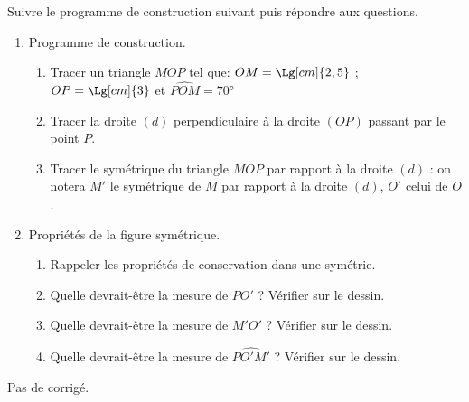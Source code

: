 \begin{exercice*}
   Suivre le programme de construction suivant puis répondre aux questions.
   \begin{enumerate}
      \item Programme de construction.
      \begin{enumerate}
         \item Tracer un triangle $MOP$ tel que: $OM = \Lg[cm]{2,5}$ ; $OP = \Lg[cm]{3}$ et $\widehat{POM} = \ang{70}$
         \item Tracer la droite $(d)$ perpendiculaire à la droite $(OP)$ passant par le point $P$.
         \item Tracer le symétrique du triangle $MOP$ par rapport à la droite $(d)$ : on notera $M'$ le symétrique de $M$ par rapport à la droite $(d)$, $O'$ celui de $O$.
      \end{enumerate}
      \item Propriétés de la figure symétrique.
      \begin{enumerate}
         \item Rappeler les propriétés de conservation dans une symétrie.
         \item Quelle devrait-être la mesure de $PO'$ ? Vérifier sur le dessin.
         \item Quelle devrait-être la mesure de $M'O'$ ? Vérifier sur le dessin.
         \item Quelle devrait-être la mesure de $\widehat{PO'M'}$ ? Vérifier sur le dessin. \\
       \end{enumerate}
   \end{enumerate}
\end{exercice*}
\begin{corrige}
   Pas de corrigé.
\end{corrige}
